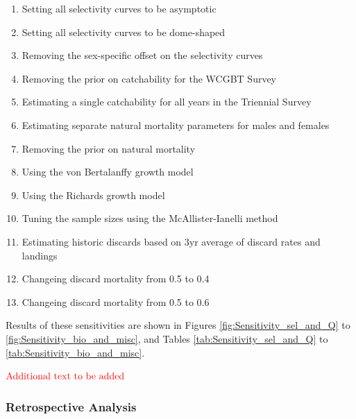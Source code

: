 \documentclass[12pt,]{article}
\begin{document}
\begin{enumerate}

  \item Setting all selectivity curves to be asymptotic
  
  \item Setting all selectivity curves to be dome-shaped

  \item Removing the sex-specific offset on the selectivity curves
  
  \item Removing the prior on catchability for the WCGBT Survey
  
  \item Estimating a single catchability for all years in the Triennial Survey
  
  \item Estimating separate natural mortality parameters for males and females
  
  \item Removing the prior on natural mortality
  
  \item Using the von Bertalanffy growth model

  \item Using the Richards growth model

  \item Tuning the sample sizes using the McAllister-Ianelli method
  
  \item Estimating historic discards based on 3yr average of discard rates and landings
  
  \item Changeing discard mortality from 0.5 to 0.4
  
  \item Changeing discard mortality from 0.5 to 0.6
  
\end{enumerate}

Results of these sensitivities are shown in Figures
\ref{fig:Sensitivity_sel_and_Q} to \ref{fig:Sensitivity_bio_and_misc},
and Tables \ref{tab:Sensitivity_sel_and_Q} to
\ref{tab:Sensitivity_bio_and_misc}.

\textbf{\(\color{red}{\text{Additional text to be added}}\)}

\hypertarget{retrospective-analysis}{%
\subsubsection{Retrospective Analysis}\label{retrospective-analysis}}
\end{document}
